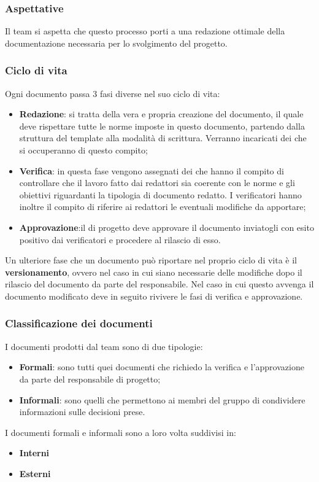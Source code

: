 \subsubsection{Aspettative}
Il team si aspetta che questo processo porti a una redazione ottimale della documentazione necessaria per lo svolgimento del progetto.

\subsubsection{Ciclo di vita}
Ogni documento passa 3 fasi  diverse nel suo ciclo di vita:
\begin{itemize}
    \item\textbf{Redazione}: si tratta della vera e propria creazione del documento, il quale deve rispettare tutte le norme imposte in questo documento, partendo dalla struttura del template alla modalità di scrittura. Verranno incaricati dei  che si occuperanno di questo compito;
    \item\textbf{Verifica}: in questa fase vengono assegnati dei  che hanno il compito di controllare che il lavoro fatto dai redattori sia coerente con le norme e gli obiettivi riguardanti la tipologia di documento redatto. I verificatori hanno inoltre il compito di riferire ai redattori le eventuali modifiche da apportare;
    \item\textbf{Approvazione}:il  di progetto deve approvare il documento inviatogli con esito positivo dai verificatori e procedere al rilascio di esso.
\end{itemize}
Un ulteriore fase che un documento può riportare nel proprio ciclo di vita è il \textbf{versionamento}, ovvero nel caso in cui siano necessarie delle modifiche dopo il rilascio del documento da parte del responsabile. Nel caso in cui questo avvenga il documento modificato deve in seguito rivivere le fasi di verifica e approvazione.


\subsubsection{Classificazione dei documenti}
I documenti prodotti dal team sono di due tipologie:
\begin{itemize}
    \item \textbf{Formali}: sono tutti quei documenti che richiedo la verifica e l'approvazione da parte del responsabile di progetto;
    \item\textbf{Informali}: sono quelli che permettono ai membri del gruppo di condividere informazioni sulle decisioni prese.
\end{itemize}
I documenti formali e informali sono a loro volta suddivisi in:
\begin{itemize}
    \item\textbf{Interni}
    \item\textbf{Esterni}
\end{itemize}


